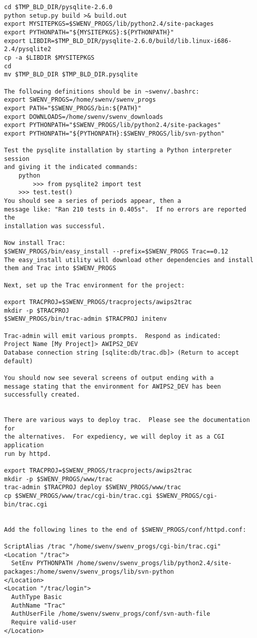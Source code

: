 \begin{verbatim}
cd $TMP_BLD_DIR/pysqlite-2.6.0
python setup.py build >& build.out
export MYSITEPKGS=$SWENV_PROGS/lib/python2.4/site-packages
export PYTHONPATH="${MYSITEPKGS}:${PYTHONPATH}"
export LIBDIR=$TMP_BLD_DIR/pysqlite-2.6.0/build/lib.linux-i686-2.4/pysqlite2
cp -a $LIBDIR $MYSITEPKGS
cd
mv $TMP_BLD_DIR $TMP_BLD_DIR.pysqlite

The following definitions should be in ~swenv/.bashrc:
export SWENV_PROGS=/home/swenv/swenv_progs
export PATH="$SWENV_PROGS/bin:${PATH}"
export DOWNLOADS=/home/swenv/swenv_downloads
export PYTHONPATH="$SWENV_PROGS/lib/python2.4/site-packages"
export PYTHONPATH="${PYTHONPATH}:$SWENV_PROGS/lib/svn-python"

Test the pysqlite installation by starting a Python interpreter session
and giving it the indicated commands: 
    python 
        >>> from pysqlite2 import test 
	>>> test.test()
You should see a series of periods appear, then a
message like: "Ran 210 tests in 0.405s".  If no errors are reported the
installation was successful.

Now install Trac:
$SWENV_PROGS/bin/easy_install --prefix=$SWENV_PROGS Trac==0.12
The easy_install utility will download other dependencies and install
them and Trac into $SWENV_PROGS

Next, set up the Trac environment for the project:

export TRACPROJ=$SWENV_PROGS/tracprojects/awips2trac
mkdir -p $TRACPROJ
$SWENV_PROGS/bin/trac-admin $TRACPROJ initenv

Trac-admin will emit various prompts.  Respond as indicated:
Project Name [My Project]> AWIPS2_DEV
Database connection string [sqlite:db/trac.db]> (Return to accept default)

You should now see several screens of output ending with a 
message stating that the environment for AWIPS2_DEV has been 
successfully created.  


There are various ways to deploy trac.  Please see the documentation for
the alternatives.  For expediency, we will deploy it as a CGI application
run by httpd.

export TRACPROJ=$SWENV_PROGS/tracprojects/awips2trac
mkdir -p $SWENV_PROGS/www/trac
trac-admin $TRACPROJ deploy $SWENV_PROGS/www/trac
cp $SWENV_PROGS/www/trac/cgi-bin/trac.cgi $SWENV_PROGS/cgi-bin/trac.cgi


Add the following lines to the end of $SWENV_PROGS/conf/httpd.conf:

ScriptAlias /trac "/home/swenv/swenv_progs/cgi-bin/trac.cgi"
<Location "/trac">
  SetEnv PYTHONPATH /home/swenv/swenv_progs/lib/python2.4/site-packages:/home/swenv/swenv_progs/lib/svn-python
</Location>
<Location "/trac/login">
  AuthType Basic
  AuthName "Trac"
  AuthUserFile /home/swenv/swenv_progs/conf/svn-auth-file
  Require valid-user
</Location>



\end{verbatim}
